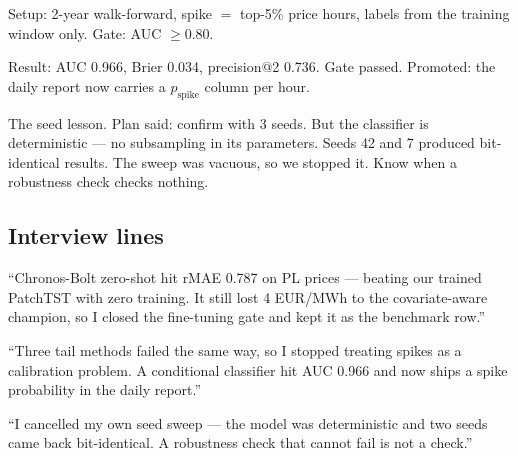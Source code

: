 Setup: 2-year walk-forward, spike $=$ top-5\% price hours,
labels from the training window only. Gate: AUC $\geq 0.80$.

Result: AUC 0.966, Brier 0.034, precision@2 0.736. Gate passed.
Promoted: the daily report now carries a $p_\text{spike}$ column
per hour.

The seed lesson. Plan said: confirm with 3 seeds. But the classifier
is deterministic --- no subsampling in its parameters. Seeds 42 and 7
produced bit-identical results. The sweep was vacuous, so we stopped
it. Know when a robustness check checks nothing.

\subsection{Interview lines}

``Chronos-Bolt zero-shot hit rMAE 0.787 on PL prices --- beating our
trained PatchTST with zero training. It still lost 4 EUR/MWh to the
covariate-aware champion, so I closed the fine-tuning gate and kept
it as the benchmark row.''

``Three tail methods failed the same way, so I stopped treating
spikes as a calibration problem. A conditional classifier hit
AUC 0.966 and now ships a spike probability in the daily report.''

``I cancelled my own seed sweep --- the model was deterministic and
two seeds came back bit-identical. A robustness check that cannot
fail is not a check.''
